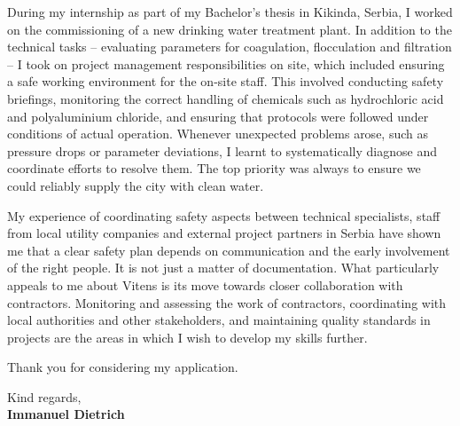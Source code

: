 \documentclass[11pt]{report}
\begin{document}
\begin{titlepage}
\vspace{0.7em}

During my internship as part of my Bachelor's thesis in Kikinda, Serbia, I worked on the commissioning of a new drinking water treatment plant. In addition to the technical tasks -- evaluating parameters for coagulation, flocculation and filtration -- 
I took on project management responsibilities on site, which included ensuring a safe working environment for the on-site staff. This involved conducting safety briefings, monitoring the correct handling of chemicals such as 
hydrochloric acid and polyaluminium chloride, and ensuring that protocols were followed under conditions of actual operation. Whenever unexpected problems arose, such as pressure drops or parameter deviations, I learnt to systematically 
diagnose and coordinate efforts to resolve them. The top priority was always to ensure we could reliably supply the city with clean water. 

\vspace{0.7em}

My experience of coordinating safety aspects between technical specialists, staff from local utility companies and external project partners in Serbia 
have shown me that a clear safety plan depends on communication and the early involvement of the right people. It is not just a matter of documentation. 
What particularly appeals to me about Vitens is its move towards closer collaboration with contractors. Monitoring and assessing the work of contractors, coordinating with local authorities and other stakeholders, 
and maintaining quality standards in projects are the areas in which I wish to develop my skills further. 

\vspace{0.7em}

Thank you for considering my application.

\vspace{0.7em}

\raggedright Kind regards,\\
\textbf{Immanuel Dietrich}

\end{titlepage}
\end{document}

